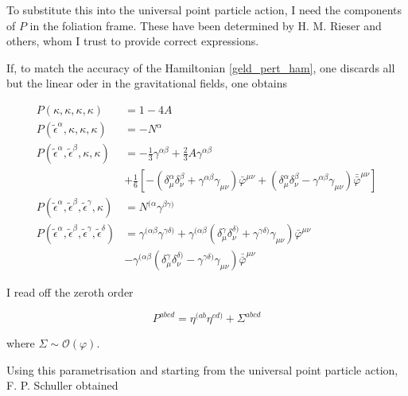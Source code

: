 \documentclass[11pt]{article}
\begin{document}
To substitute this into the universal point particle action, I need the components of $P$  in the foliation frame. These have been determined by H. M. Rieser and others, whom I trust to provide correct expressions.

If, to match the accuracy of the  Hamiltonian \ref{geld_pert_ham}, one discards all but the linear oder in the gravitational fields, one obtains

\begin{align}
	P \left( \kappa, \kappa, \kappa, \kappa \right)
	&= 1 - 4A  \label{p0000} \\
	P \left( \tilde{\epsilon}^\alpha, \kappa, \kappa, \kappa \right)
	&= - N^\alpha \\
	P \left( \tilde{\epsilon}^\alpha, \tilde{\epsilon}^\beta, \kappa, \kappa \right)
	&= - \frac{1}{3} \gamma^{\alpha \beta}
	+ \frac{2}{3} A \gamma^{\alpha \beta} \\
	&+ \frac{1}{6} 
	\left[
		- 
		\left( 
			\delta^\alpha_\mu \delta^\beta_\nu 
			+ \gamma^{\alpha \beta} \gamma_{\mu \nu} 
		\right)
		\bar{\varphi}^{\mu \nu}
		+
		\left( 
			\delta^\alpha_\mu \delta^\beta_\nu 
			- \gamma^{\alpha \beta} \gamma_{\mu \nu} 
		\right)
		\bar{\bar{\varphi}}^{\mu \nu}
	\right] \\
	P \left( \tilde{\epsilon}^\alpha, \tilde{\epsilon}^\beta, \tilde{\epsilon}^\gamma, \kappa \right)
	&= N^{( \alpha}\gamma^{\beta \gamma )}\\
	P \left( \tilde{\epsilon}^\alpha, \tilde{\epsilon}^\beta, \tilde{\epsilon}^\gamma, \tilde{\epsilon}^\delta \right)
	&= \gamma^{( \alpha \beta} \gamma^{\gamma \delta )}
	+ 
	\gamma^{( \alpha \beta}
	\left( 
		\delta^\gamma_\mu \delta^{\delta ) }_\nu 
		+ \gamma^{\gamma \delta ) } \gamma_{\mu \nu} 
	\right)
	\bar{\varphi}^{\mu \nu} \\
	&- 
	\gamma^{( \alpha \beta}
	\left( 
		\delta^\gamma_\mu \delta^{\delta ) }_\nu 
		- \gamma^{\gamma \delta ) } \gamma_{\mu \nu} 
	\right)
	\bar{\bar{\varphi}}^{\mu \nu} \label{pabcd}
\end{align}

I read off the zeroth order

\begin{equation}
	P^{a b c d} = \eta^{ ( a b } \eta^{ c d )} + \Sigma^{ a b c d}
\end{equation}

where $\Sigma \sim \mathcal{O} \left( \varphi \right)$.

Using this parametrisation and starting from the universal point particle action, F. P. Schuller obtained
\end{document}
